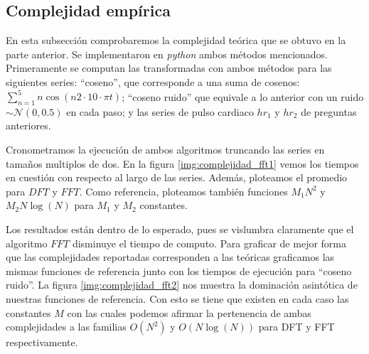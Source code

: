 \documentclass[letterpaper,11pt,oneside]{article}
\theoremstyle{break}
\begin{document}
\subsection{Complejidad empírica}
En esta subsección comprobaremos la complejidad teórica que se obtuvo en la parte anterior. Se implementaron en \textit{python} ambos métodos mencionados.  %
Primeramente se computan las transformadas con ambos métodos para las siguientes series: ``coseno'', que corresponde a una suma de cosenos: $\sum^5_{n=1}n\cos(n 2\cdot 10\cdot \pi t)$; ``coseno ruido'' que equivale a lo anterior con un ruido $\sim\mathcal{N}(0,0.5)$ en cada paso; y las series de pulso cardiaco $hr_1$ y $hr_2$ de preguntas anteriores.

\newp Cronometramos la ejecución de ambos algoritmos truncando las series en tamaños multiplos de dos. En la figura \ref{img:complejidad_fft1} vemos los tiempos en cuestión con respecto al largo de las series. Además, ploteamos el promedio para $DFT$ y $FFT$. Como referencia, ploteamos también funciones $M_1 N^2$ y $M_2 N\log(N)$ para $M_1$ y $M_2$ constantes.



Los resultados están dentro de lo esperado, pues se vislumbra claramente que el algoritmo $FFT$ disminuye el tiempo de computo. Para graficar de mejor forma que las complejidades reportadas corresponden a las teóricas graficamos las mismas funciones de referencia junto con los tiempos de ejecución para ``coseno ruido''. La figura \ref{img:complejidad_fft2} nos muestra la dominación asintótica de nuestras funciones de referencia. Con esto se tiene que existen en cada caso las constantes $M$ con las cuales podemos afirmar la pertenencia de ambas complejidades a las familias $O(N^2)$ y $O(N\log(N))$ para DFT y FFT respectivamente.



\end{document}
